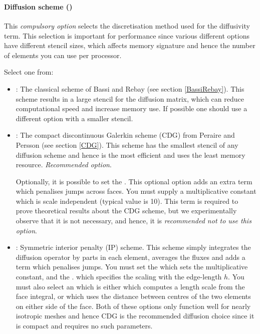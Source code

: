  \\
 \\

\paragraph{Diffusion scheme ()}
This \emph{compulsory option} selects the discretisation method used
for the diffusivity term. This selection is important for performance
since various different options have different stencil sizes, which
affects memory signature and hence the number of elements you can use
per processor.

Select one from:
\begin{itemize}
\item {}: The classical scheme of Bassi and Rebay (see
  section \ref{BassiRebay}). This scheme results in a large stencil
  for the diffusion matrix, which can reduce computational speed and
  increase memory use. If possible one should use a different option
  with a smaller stencil.
\item {}: The compact
  discontinuous Galerkin scheme (CDG) from Peraire and Persson
  \citep{peraire2008} (see section \ref{CDG}). This scheme has the
  smallest stencil of any diffusion scheme and hence is the most
  efficient and uses the least memory resource. \emph{Recommended
    option}.

  Optionally, it is possible to set the
  . This
  optional option adds an extra term which penalises jumps across
  faces. You must supply a multiplicative constant which is scale
  independent (typical value is 10). This term is required to prove
  theoretical results about the CDG scheme, but we experimentally
  observe that it is not necessary, and hence, it is \emph{recommended
    not to use this option}.
\item {}: Symmetric interior penalty (IP)
  scheme. This scheme simply integrates the diffusion operator by
  parts in each element, averages the fluxes and adds a term which
  penalises jumps. You must set the 
   which sets the
  multiplicative constant, and the .
  which specifies the scaling with the edge-length $h$. You must also
  select an  which is either
   which computes a length scale from the
  face integral, or  which uses the
  distance between centres of the two elements on either side of the
  face. Both of these options only function well for nearly isotropic
  meshes and hence CDG is the recommended diffusion choice since it
  is compact and requires no such parameters.
\end{itemize}

